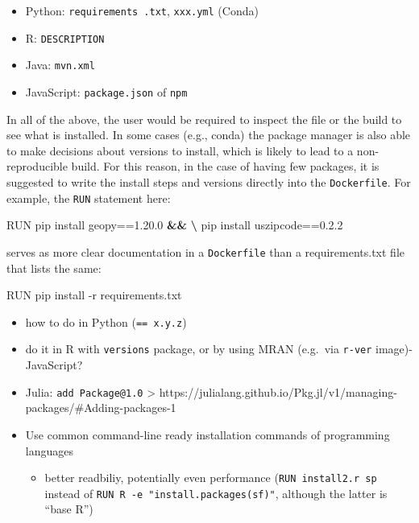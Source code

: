 \documentclass[10pt,letterpaper]{article}
\newenvironment{Shaded}{\begin{snugshade}}{\end{snugshade}}
\newcommand{\ExtensionTok}[1]{#1}
\newcommand{\KeywordTok}[1]{\textcolor[rgb]{0.13,0.29,0.53}{\textbf{#1}}}
\newcommand{\NormalTok}[1]{#1}
\providecommand{\tightlist}{%
  \setlength{\itemsep}{0pt}\setlength{\parskip}{0pt}}
\begin{document}
\begin{itemize}
\tightlist
\item
  Python: \texttt{requirements\ .txt}, \texttt{xxx.yml} (Conda)
\item
  R: \texttt{DESCRIPTION}
\item
  Java: \texttt{mvn.xml}
\item
  JavaScript: \texttt{package.json} of \texttt{npm}
\end{itemize}

In all of the above, the user would be required to inspect the file or
the build to see what is installed. In some cases (e.g., conda) the
package manager is also able to make decisions about versions to
install, which is likely to lead to a non-reproducible build. For this
reason, in the case of having few packages, it is suggested to write the
install steps and versions directly into the \texttt{Dockerfile}. For
example, the \texttt{RUN} statement here:

\begin{Shaded}
\begin{Highlighting}[]
\ExtensionTok{RUN}\NormalTok{ pip install geopy==1.20.0 }\KeywordTok{&&} \KeywordTok{\textbackslash{}}
    \ExtensionTok{pip}\NormalTok{ install uszipcode==0.2.2}
\end{Highlighting}
\end{Shaded}

serves as more clear documentation in a \texttt{Dockerfile} than a
requirements.txt file that lists the same:

\begin{Shaded}
\begin{Highlighting}[]
\ExtensionTok{RUN}\NormalTok{ pip install -r requirements.txt}
\end{Highlighting}
\end{Shaded}

\begin{itemize}
\tightlist
\item
  how to do in Python (\texttt{==\ x.y.z})
\item
  do it in R with \texttt{versions} package, or by using MRAN (e.g.~via
  \texttt{r-ver} image)- JavaScript?
\item
  Julia: \texttt{add\ Package@1.0} \textgreater{}
  https://julialang.github.io/Pkg.jl/v1/managing-packages/\#Adding-packages-1
\item
  Use common command-line ready installation commands of programming
  languages

  \begin{itemize}
  \tightlist
  \item
    better readbiliy, potentially even performance
    (\texttt{RUN\ install2.r\ sp} instead of
    \texttt{RUN\ R\ -e\ "install.packages(\textquotesingle{}sf\textquotesingle{})"},
    although the latter is ``base R'')
  \end{itemize}
\end{itemize}
\end{document}

